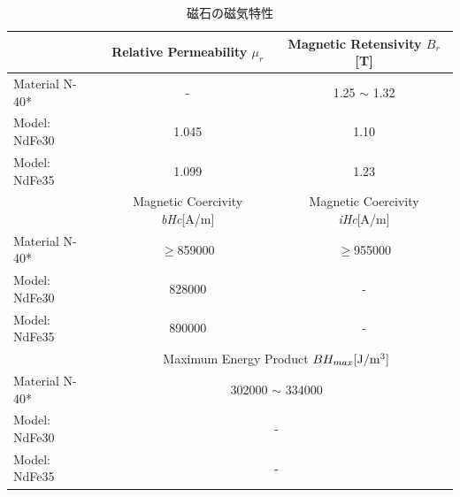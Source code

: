 \documentclass[11pt]{jarticle}
\begin{document}
  \begin{table}[H]
    \begin{tabular}{||l||c|c||} \hline \hline

      & Relative Permeability $\mu_r$ & Magnetic Retensivity $B_r$[T] \\ \hline
      Material N-40* & - & 1.25 $\sim$ 1.32  \\ \hline
      Model: NdFe30 & 1.045 & 1.10 \\ \hline
      Model: NdFe35 & 1.099 & 1.23 \\ \hline \hline

     & Magnetic Coercivity {\it bHc}[A/m] & Magnetic Coercivity {\it iHc}[A/m] \\ \hline
      Material N-40* & $\geq$859000 & $\geq$955000 \\ \hline
      Model: NdFe30 & 828000 & - \\ \hline
      Model: NdFe35 & 890000 & - \\ \hline \hline

     & \multicolumn{2}{|c|}{ Maximum Energy Product $BH_{max}{\rm [J/m^3]}$ } \\ \hline
      Material N-40* & \multicolumn{2}{|c|}{ 302000 $\sim$ 334000 } \\ \hline
      Model: NdFe30 & \multicolumn{2}{|c|}{ - } \\ \hline
      Model: NdFe35 & \multicolumn{2}{|c|}{ - } \\ \hline \hline

    \end{tabular}
    \centering
    \caption{磁石の磁気特性}
    \label{tab:magnet_property}
  \end{table}

\end{document}
